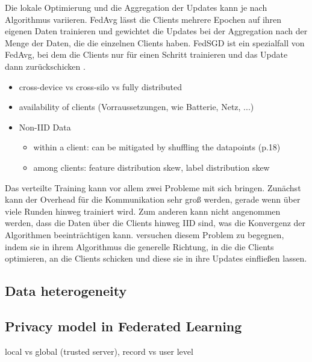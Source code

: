 Die lokale Optimierung und die Aggregation der Updates kann je nach Algorithmus variieren. FedAvg lässt die Clients mehrere Epochen auf ihren eigenen Daten trainieren und gewichtet die Updates bei der Aggregation nach der Menge der Daten, die die einzelnen Clients haben. FedSGD ist ein spezialfall von FedAvg, bei dem die Clients nur für einen Schritt trainieren und das Update dann zurückschicken \parencite{mcmahan:2016}.

\begin{itemize}
	\item cross-device vs cross-silo vs fully distributed
	\item availability of clients (Vorraussetzungen, wie Batterie, Netz, ...)
	\item Non-IID Data
	\begin{itemize}
		\item within a client: can be mitigated by shuffling the datapoints (p.18)
		\item among clients: feature distribution skew, label distribution skew
	\end{itemize}
\end{itemize}

Das verteilte Training kann vor allem zwei Probleme mit sich bringen. Zunächst kann der Overhead für die Kommunikation sehr groß werden, gerade wenn über viele Runden hinweg trainiert wird. Zum anderen kann nicht angenommen werden, dass die Daten über die Clients hinweg IID sind, was die Konvergenz der Algorithmen beeinträchtigen kann. \textcite{karimireddy:2020} versuchen diesem Problem zu begegnen, indem sie in ihrem Algorithmus die generelle Richtung, in die die Clients optimieren, an die Clients schicken und diese sie in ihre Updates einfließen lassen.

\subsection{Data heterogeneity}

\subsection{Privacy model in Federated Learning}
local vs global (trusted server), record vs user level
